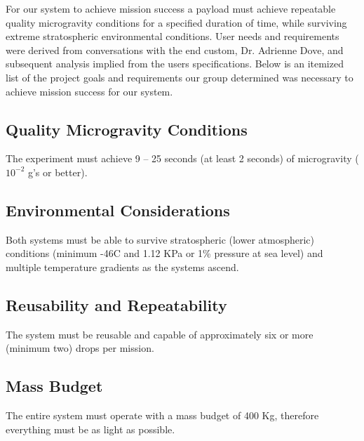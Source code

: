 \indent\indent For our system to achieve mission success a payload must achieve repeatable quality microgravity conditions for a specified duration of time, while surviving extreme stratospheric environmental conditions. User needs and requirements were derived from conversations with the end custom, Dr. Adrienne Dove, and subsequent analysis implied from the users specifications. Below is an itemized list of the project goals and requirements our group determined was necessary to achieve mission success for our system. 

\subsection{Quality Microgravity Conditions}

\indent\indent The experiment must achieve 9 – 25 seconds (at least 2 seconds) of microgravity ($10^{\minus 2}$ g’s or better).


\subsection{Environmental Considerations}

\indent\indent Both systems must be able to survive stratospheric (lower atmospheric) conditions (minimum -46\degree C and 1.12 KPa or 1\% pressure at sea level) and multiple temperature gradients as the systems ascend.


\subsection{Reusability and Repeatability}

\indent\indent The system must be reusable and capable of approximately six or more (minimum two) drops per mission.


\subsection{Mass Budget}

\indent\indent The entire system must operate with a mass budget of 400 Kg, therefore everything must be as light as possible.


